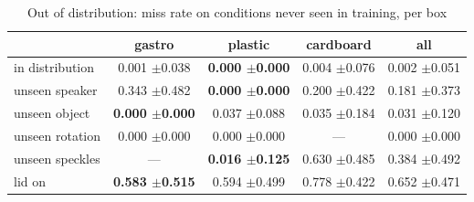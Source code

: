 \begin{table}
\caption{Out of distribution: miss rate on conditions never seen in training, per box}
\label{tab:ood_miss}
\begin{tabular}{l!{\vrule width 1.2pt}ccc!{\vrule width 1.2pt}c}
\toprule
 & gastro & plastic & cardboard & all \\
\midrule
in distribution & 0.001 {\scriptsize $\pm$0.038} & \bfseries 0.000 {\scriptsize $\pm$0.000} & 0.004 {\scriptsize $\pm$0.076} & 0.002 {\scriptsize $\pm$0.051} \\
unseen speaker & 0.343 {\scriptsize $\pm$0.482} & \bfseries 0.000 {\scriptsize $\pm$0.000} & 0.200 {\scriptsize $\pm$0.422} & 0.181 {\scriptsize $\pm$0.373} \\
unseen object & \bfseries 0.000 {\scriptsize $\pm$0.000} & 0.037 {\scriptsize $\pm$0.088} & 0.035 {\scriptsize $\pm$0.184} & 0.031 {\scriptsize $\pm$0.120} \\
unseen rotation & 0.000 {\scriptsize $\pm$0.000} & 0.000 {\scriptsize $\pm$0.000} & — & 0.000 {\scriptsize $\pm$0.000} \\
unseen speckles & — & \bfseries 0.016 {\scriptsize $\pm$0.125} & 0.630 {\scriptsize $\pm$0.485} & 0.384 {\scriptsize $\pm$0.492} \\
lid on & \bfseries 0.583 {\scriptsize $\pm$0.515} & 0.594 {\scriptsize $\pm$0.499} & 0.778 {\scriptsize $\pm$0.422} & 0.652 {\scriptsize $\pm$0.471} \\
\bottomrule
\end{tabular}
\end{table}
